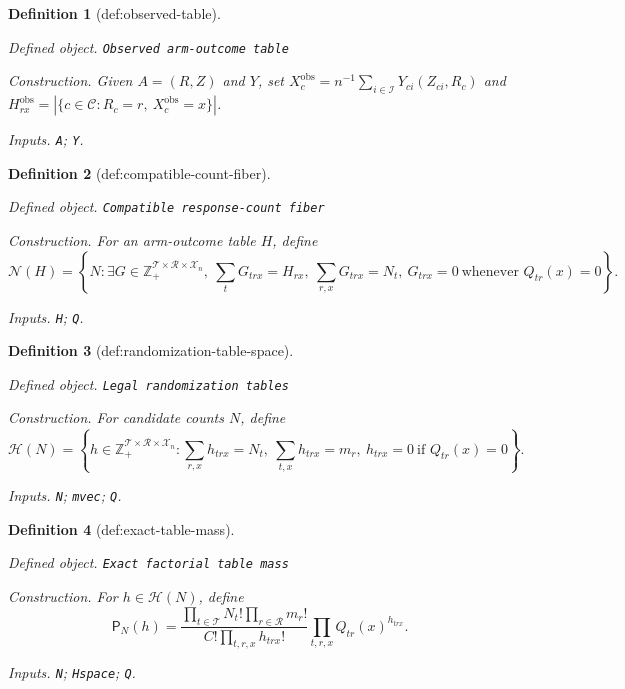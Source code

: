 \documentclass{article}
\newtheorem{definition}{Definition}
\begin{document}
\begin{definition}[def:observed-table]\label{def:observed-table}
\par\smallskip\noindent\emph{Defined object.} \texttt{Observed arm-\allowbreak{}outcome table}
\par\smallskip\noindent\emph{Construction.} Given \(A=(R,Z)\) and \(Y\), set \(X_c^{\mathrm{obs}}=n^{-1}\sum_{i\in\mathcal I}Y_{ci}(Z_{ci},R_c)\) and \(H_{rx}^{\mathrm{obs}}=|\{c\in\mathcal C:R_c=r,\ X_c^{\mathrm{obs}}=x\}|\).
\par\smallskip\noindent\emph{Inputs.} \texttt{A}; \texttt{Y}.
\end{definition}

\begin{definition}[def:compatible-count-fiber]\label{def:compatible-count-fiber}
\par\smallskip\noindent\emph{Defined object.} \texttt{Compatible response-\allowbreak{}count fiber}
\par\smallskip\noindent\emph{Construction.} For an arm-outcome table \(H\), define \[\mathcal N(H)=\left\{N:\exists G\in\mathbb Z_+^{\mathcal T\times\mathcal R\times\mathcal X_n},\ \sum_tG_{trx}=H_{rx},\ \sum_{r,x}G_{trx}=N_t,\ G_{trx}=0\ \text{whenever }Q_{tr}(x)=0\right\}.\]
\par\smallskip\noindent\emph{Inputs.} \texttt{H}; \texttt{Q}.
\end{definition}

\begin{definition}[def:randomization-table-space]\label{def:randomization-table-space}
\par\smallskip\noindent\emph{Defined object.} \texttt{Legal randomization tables}
\par\smallskip\noindent\emph{Construction.} For candidate counts \(N\), define \[\mathcal H(N)=\left\{h\in\mathbb Z_+^{\mathcal T\times\mathcal R\times\mathcal X_n}:\sum_{r,x}h_{trx}=N_t,\ \sum_{t,x}h_{trx}=m_r,\ h_{trx}=0\ \text{if }Q_{tr}(x)=0\right\}.\]
\par\smallskip\noindent\emph{Inputs.} \texttt{N}; \texttt{mvec}; \texttt{Q}.
\end{definition}

\begin{definition}[def:exact-table-mass]\label{def:exact-table-mass}
\par\smallskip\noindent\emph{Defined object.} \texttt{Exact factorial table mass}
\par\smallskip\noindent\emph{Construction.} For \(h\in\mathcal H(N)\), define \[\mathsf P_N(h)=\frac{\prod_{t\in\mathcal T}N_t!\prod_{r\in\mathcal R}m_r!}{C!\prod_{t,r,x}h_{trx}!}\prod_{t,r,x}Q_{tr}(x)^{h_{trx}}.\]
\par\smallskip\noindent\emph{Inputs.} \texttt{N}; \texttt{Hspace}; \texttt{Q}.
\end{definition}
\end{document}
